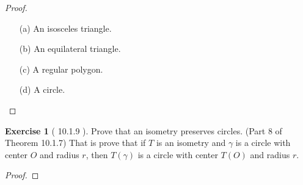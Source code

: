 \documentclass[11pt]{article}		%
\theoremstyle{definition}
\newtheorem*{exercise*}{Exercise}
\begin{document}
\begin{proof}
	$\,$
	
	\begin{enumerate}
		\item[(a)] An isosceles triangle.

		\item[(b)] An equilateral triangle.
		
		\item[(c)] A regular polygon.
		
		\item[(d)] A circle.
	\end{enumerate}
	
\end{proof}


\vspace{1in}





\begin{exercise*}[ 10.1.9    ]
	Prove that an isometry preserves circles. (Part 8 of Theorem 10.1.7)  That is prove that if $T$ is an isometry and $\gamma$ is a circle with center $O$ and radius $r$, then $T(\gamma)$ is a circle with center $T(O)$ and radius $r$.
	
\end{exercise*}

\begin{proof} 
	
\end{proof}
\end{document}
